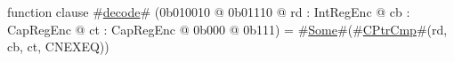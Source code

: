 function clause #\hyperref[sailMIPSzdecode]{decode}# (0b010010 @ 0b01110 @ rd : IntRegEnc @ cb : CapRegEnc @ ct : CapRegEnc @ 0b000 @ 0b111) = #\hyperref[sailMIPSzSome]{Some}#(#\hyperref[sailMIPSzCPtrCmp]{CPtrCmp}#(rd, cb, ct, CNEXEQ))
